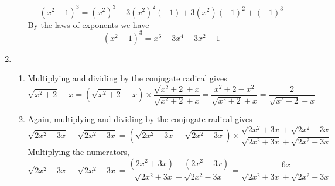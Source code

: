 \documentclass{article}
\begin{document}
\begin{enumerate}
\begin{enumerate}
\begin{equation*}
      (x^2-1)^3 = (x^2)^3 + 3(x^2)^2(-1) + 3(x^2)(-1)^2 + (-1)^3
    \end{equation*}
    By the laws of exponents we have
    \begin{equation*}
      (x^2-1)^3 = x^6 - 3x^4 + 3x^2 -1
    \end{equation*}
  \end{enumerate}
\item %
  \begin{enumerate}
  \item Multiplying and dividing by the conjugate radical gives
    \begin{equation*}
      \sqrt{x^2+2}-x = (\sqrt{x^2+2}-x) \times 
        \frac{ \sqrt{x^2+2}+x }{ \sqrt{x^2+2}+x }
      = \frac{x^2+2 - x^2}{ \sqrt{x^2+2}+x }
      = \frac{2}{ \sqrt{x^2+2}+x }
    \end{equation*}
  \item Again, multiplying and dividing by the conjugate radical gives
    \begin{equation*}
      \sqrt{2x^2+3x}-\sqrt{2x^2-3x}
      = (\sqrt{2x^2+3x}-\sqrt{2x^2-3x}) \times
        \frac{ \sqrt{2x^2+3x}+\sqrt{2x^2-3x} }{ \sqrt{2x^2+3x}+\sqrt{2x^2-3x} }
    \end{equation*}
    Multiplying the numerators,
    \begin{equation*}
      \sqrt{2x^2+3x}-\sqrt{2x^2-3x}
      = \frac{ (2x^2+3x)-(2x^2-3x) }{ \sqrt{2x^2+3x}+\sqrt{2x^2-3x} }
      = \frac{ 6x }{ \sqrt{2x^2+3x}+\sqrt{2x^2-3x} }
    \end{equation*}
  \end{enumerate}
\end{enumerate}
\end{document}
